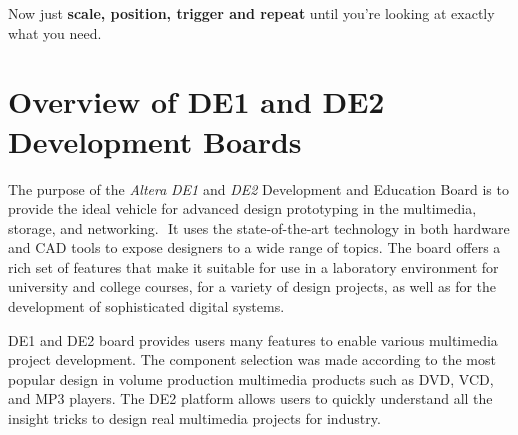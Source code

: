 \documentclass[12pt, logo=tehranDLDL/ut]{tehranDLDL}
\begin{document}
Now just \textbf{scale, position, trigger and repeat} until you're looking at exactly what you need.

\section{Overview of DE1 and DE2 Development Boards}

The purpose of the \textit{Altera} \textit{DE1} and \textit{DE2} Development and Education Board is to provide the ideal vehicle for advanced design prototyping in the multimedia, storage, and networking.  It uses the state-of-the-art technology in both hardware and CAD tools to expose designers to a wide range of topics. The board offers a rich set of features that make it suitable for use in a laboratory environment for university and college courses, for a variety of design projects, as well as for the development of sophisticated digital systems.

DE1 and DE2 board provides users many features to enable various multimedia project development. The component selection was made according to the most popular design in volume production multimedia products such as DVD, VCD, and MP3 players. The DE2 platform allows users to quickly understand all the insight tricks to design real multimedia projects for industry.
\end{document}
